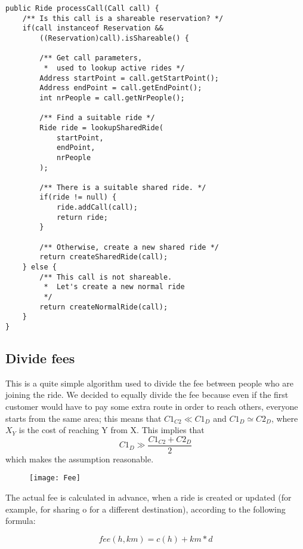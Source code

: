 \begin{lstlisting}[caption={processCall()}]
public Ride processCall(Call call) {
    /** Is this call is a shareable reservation? */
    if(call instanceof Reservation && 
        ((Reservation)call).isShareable() {

        /** Get call parameters, 
         *  used to lookup active rides */
        Address startPoint = call.getStartPoint();
        Address endPoint = call.getEndPoint();
        int nrPeople = call.getNrPeople();

        /** Find a suitable ride */
        Ride ride = lookupSharedRide(
            startPoint, 
            endPoint, 
            nrPeople
        );

        /** There is a suitable shared ride. */
        if(ride != null) {
            ride.addCall(call);
            return ride;
        }
        
        /** Otherwise, create a new shared ride */
        return createSharedRide(call);
    } else {
        /** This call is not shareable. 
         *  Let's create a new normal ride
         */
        return createNormalRide(call); 
    }
}
\end{lstlisting}
\pagebreak
\subsection{Divide fees}
This is a quite simple algorithm used to divide the fee between 
people who are joining the ride. We decided to equally divide the fee
because even if the first customer would have to pay some extra route
in order to reach others, everyone starts from the same area; this means
that $C1_{C2} \ll C1_D$ and $C1_D \simeq C2_D$, where $X_Y$ is the cost of reaching Y from X. This implies that
\begin{equation}
    C1_D \gg \frac{C1_{C2} + C2_D}{2}
\end{equation}
which makes the assumption reasonable.

\begin{figure}[h!]
    \centering
    \texttt{[image: Fee]}
\end{figure}

The actual fee is calculated in advance, when a ride is created or updated (for example, for sharing o for a different destination), according to the following formula:

\begin{equation}
    fee(h,km) = c(h) + km*d
\end{equation}


